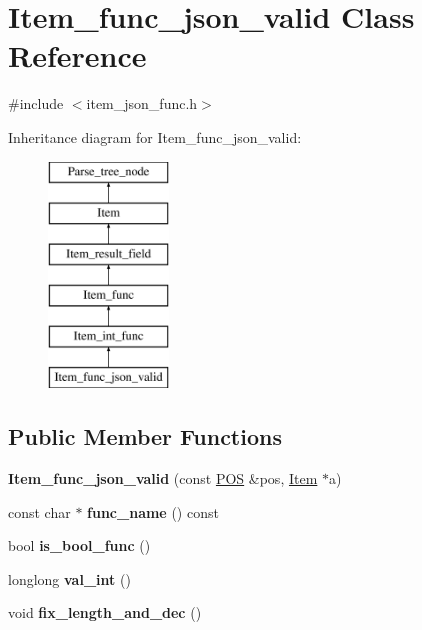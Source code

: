 \hypertarget{classItem__func__json__valid}{}\section{Item\+\_\+func\+\_\+json\+\_\+valid Class Reference}
\label{classItem__func__json__valid}


{\ttfamily \#include $<$item\+\_\+json\+\_\+func.\+h$>$}

Inheritance diagram for Item\+\_\+func\+\_\+json\+\_\+valid\+:\begin{figure}[H]
\begin{center}
\leavevmode
\includegraphics[height=6.000000cm]{classItem__func__json__valid}
\end{center}
\end{figure}
\subsection*{Public Member Functions}
\begin{DoxyCompactItemize}
\item 
\mbox{\label{classItem__func__json__valid_a31ef16a72459f2430c04c34b9b1352f6}} 
{\bfseries Item\+\_\+func\+\_\+json\+\_\+valid} (const \mbox{\hyperlink{structYYLTYPE}{P\+OS}} \&pos, \mbox{\hyperlink{classItem}{Item}} $\ast$a)
\item 
\mbox{\label{classItem__func__json__valid_a5337e097ac2c23fe83e92462b113e3c6}} 
const char $\ast$ {\bfseries func\+\_\+name} () const
\item 
\mbox{\label{classItem__func__json__valid_a30c51dc093f0018f8621dc4def476734}} 
bool {\bfseries is\+\_\+bool\+\_\+func} ()
\item 
\mbox{\label{classItem__func__json__valid_ad52a577c52ef2291d8ab1c6f76984cad}} 
longlong {\bfseries val\+\_\+int} ()
\item 
\mbox{\label{classItem__func__json__valid_a0f672342fbe04d3053e41ab07eceef8b}} 
void {\bfseries fix\+\_\+length\+\_\+and\+\_\+dec} ()
\end{DoxyCompactItemize}
